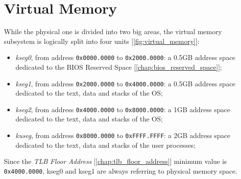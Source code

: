 \documentclass[12pt,a4paper,openright,twoside]{report}
\begin{document}
\section{Virtual Memory}
While the physical one is divided into two big areas, the virtual memory subsystem is logically split into four units [\autoref{fig:virtual_memory}]:
\begin{itemize}
	\item \textit{kseg0}, from address \texttt{0x0000.0000} to \texttt{0x2000.0000}: a 0.5GB address space dedicated to the BIOS Reserved Space [\autoref{chap:bios_reserved_space}];
	\item \textit{kseg1}, from address \texttt{0x2000.0000} to \texttt{0x4000.0000}: a 0.5GB address space dedicated to the text, data and stacks of the OS;
	\item \textit{kseg2}, from address \texttt{0x4000.0000} to \texttt{0x8000.0000}: a 1GB address space dedicated to the text, data and stacks of the OS;
	\item \textit{kuseg}, from address \texttt{0x8000.0000} to \texttt{0xFFFF.FFFF}: a 2GB address space dedicated to the text, data and stacks of the user processes;
\end{itemize}

Since the \textit{TLB Floor Address} [\autoref{chap:tlb_floor_address}] minimum value is \texttt{0x4000.0000}, kseg0 and kseg1 are always referring to physical memory space.
\end{document}
